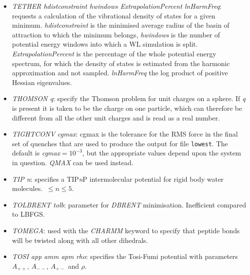 \documentclass[12pt,a4paper,dvips]{article}
\begin{document}
\begin{itemize}
\item {\it TETHER hdistconstraint hwindows ExtrapolationPercent lnHarmFreq}: requests a calculation of the vibrational density of
states for a given minimum. {\it hdistconstraint} is the minimised average radius of the basin of attraction to which the minimum
belongs, {\it hwindows} is the number of potential energy windows into which a WL simulation is split. {\it 
ExtrapolationPercent} is the percentage of the whole potential energy spectrum, for which the density of states is estimated from
the harmonic approximation and not sampled. {\it lnHarmFreq} the log product of positive Hessian
eigenvalues.

\item{\it THOMSON q\/}: specify the Thomson problem for unit charges on a sphere.
If {\it q\/} is present it is taken to be the charge on one particle, which can
therefore be different from all the other unit charges and is read as a real number.


\item {\it TIGHTCONV cgmax\/}: cgmax is the tolerance for the
RMS force in the final set of quenches that are used to produce
the output for file {\tt lowest}. The default is
{\it cgmax\/}$=10^{-3}$, but the appropriate values depend upon the system in question.
{\it QMAX} can be used instead.

\item {\it TIP n\/}: specifies a TIP{\it n\/}P intermolecular potential for rigid body water molecules.
$\ \le n \le 5$.

\item {\it TOLBRENT tolb\/}: parameter for {\it DBRENT\/} minimisation. 
Inefficient compared to LBFGS.

\item{\it TOMEGA}: used with the {\it CHARMM} keyword to specify that peptide bonds will be twisted along with all other dihedrals.


\item {\it TOSI app amm apm rho\/}: specifies the Tosi-Fumi potential\cite{tosif64}
with parameters $A_{++}$, $A_{--}$, $A_{+-}$ and $\rho$.


\end{itemize}
\end{document}
